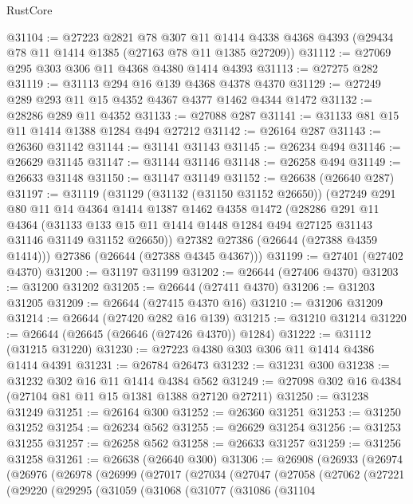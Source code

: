 \begin{lexlean}{RustCore}
\begin{coremodule}
@31104 := @27223
    @2821
    @78
    @307
    @11
    @1414
    @4338
    @4368
    @4393
    (@29434 @78 @11 @1414 @1385 (@27163 @78 @11 @1385 @27209))
@31112 := @27069 @295 @303 @306 @11 @4368 @4380 @1414 @4393
@31113 := @27275 @282
@31119 := @31113 @294 @16 @139 @4368 @4378 @4370
@31129 := @27249 @289 @293 @11 @15 @4352 @4367 @4377 @1462 @4344 @1472
@31132 := @28286 @289 @11 @4352
@31133 := @27088 @287
@31141 := @31133 @81 @15 @11 @1414 @1388 @1284 @494 @27212
@31142 := @26164 @287
@31143 := @26360 @31142
@31144 := @31141 @31143
@31145 := @26234 @494
@31146 := @26629 @31145
@31147 := @31144 @31146
@31148 := @26258 @494
@31149 := @26633 @31148
@31150 := @31147 @31149
@31152 := @26638 (@26640 @287)
@31197 := @31119
    (@31129
      (@31132 (@31150 @31152 @26650))
      (@27249
        @291
        @80
        @11
        @14
        @4364
        @1414
        @1387
        @1462
        @4358
        @1472
        (@28286
          @291
          @11
          @4364
          (@31133 @133 @15 @11 @1414 @1448 @1284 @494 @27125 @31143 @31146 @31149 @31152 @26650))
        @27382
        @27386
        (@26644 (@27388 @4359 @1414)))
      @27386
      (@26644 (@27388 @4345 @4367)))
@31199 := @27401 (@27402 @4370)
@31200 := @31197 @31199
@31202 := @26644 (@27406 @4370)
@31203 := @31200 @31202
@31205 := @26644 (@27411 @4370)
@31206 := @31203 @31205
@31209 := @26644 (@27415 @4370 @16)
@31210 := @31206 @31209
@31214 := @26644 (@27420 @282 @16 @139)
@31215 := @31210 @31214
@31220 := @26644 (@26645 (@26646 (@27426 @4370)) @1284)
@31222 := @31112 (@31215 @31220)
@31230 := @27223 @4380 @303 @306 @11 @1414 @4386 @1414 @4391
@31231 := @26784 @26473
@31232 := @31231 @300
@31238 := @31232 @302 @16 @11 @1414 @4384 @562
@31249 := @27098 @302 @16 @4384 (@27104 @81 @11 @15 @1381 @1388 @27120 @27211)
@31250 := @31238 @31249
@31251 := @26164 @300
@31252 := @26360 @31251
@31253 := @31250 @31252
@31254 := @26234 @562
@31255 := @26629 @31254
@31256 := @31253 @31255
@31257 := @26258 @562
@31258 := @26633 @31257
@31259 := @31256 @31258
@31261 := @26638 (@26640 @300)
@31306 := @26908
    (@26933
      (@26974
        (@26976
          (@26978
            (@26999
              (@27017
                (@27034
                  (@27047
                    (@27058
                      (@27062
                        (@27221
                          (@29220
                            (@29295
                              (@31059
                                (@31068
                                  (@31077
                                    (@31086
                                      (@31104

\end{coremodule}
\end{lexlean}
